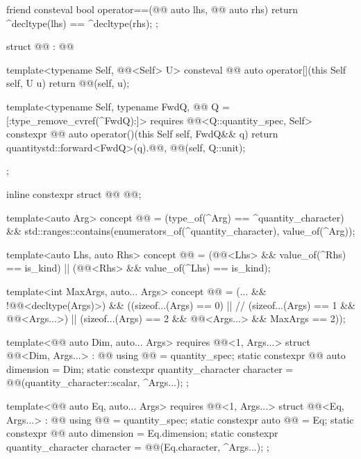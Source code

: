 \begin{codeblock}
{{  friend consteval bool operator==(@@ auto lhs, @@ auto rhs)
  {
    return ^decltype(lhs) == ^decltype(rhs);
  }
};

struct @@ : @@ {
  template<typename Self, @@<Self{}> U>
  consteval @@ auto operator[](this Self self, U u)
  {
    return @@(self, u);
  }

  template<typename Self, typename FwdQ, @@ Q = [:type_remove_cvref(^FwdQ):]>
    requires @@<Q::quantity_spec, Self{}>
  constexpr @@ auto operator()(this Self self, FwdQ&& q)
  {
    return quantity{std::forward<FwdQ>(q).@@, @@(self, Q::unit)};
  }
};

inline constexpr struct @@ {
} @@;

template<auto Arg>
concept @@ =
  (type_of(^Arg) == ^quantity_character) &&
  std::ranges::contains(enumerators_of(^quantity_character), value_of(^Arg));

template<auto Lhs, auto Rhs>
concept @@ = (@@<Lhs> && value_of(^Rhs) == is_kind) ||
                               (@@<Rhs> && value_of(^Lhs) == is_kind);

template<int MaxArgs, auto... Args>
concept @@ =
  (... && !@@<decltype(Args)>) &&
  ((sizeof...(Args) == 0) ||  //
   (sizeof...(Args) == 1 && @@<Args...>) ||
   (sizeof...(Args) == 2 && @@<Args...> && MaxArgs == 2));

template<@@ auto Dim, auto... Args>
  requires @@<1, Args...>
struct @@<Dim, Args...> : @@ {
  using @@ = quantity_spec;
  static constexpr @@ auto dimension = Dim;
  static constexpr quantity_character character =
    @@(quantity_character::scalar, {^Args...});
};

template<@@ auto Eq, auto... Args>
  requires @@<1, Args...>
struct @@<Eq, Args...> : @@ {
  using @@ = quantity_spec;
  static constexpr auto @@ = Eq;
  static constexpr @@ auto dimension = Eq.dimension;
  static constexpr quantity_character character =
    @@(Eq.character, {^Args...});
};

}
\end{codeblock}

